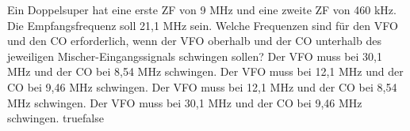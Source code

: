     {Ein Doppelsuper hat eine erste ZF von 9 MHz und eine zweite ZF von 460 kHz. Die Empfangsfrequenz soll 21,1 MHz sein. Welche Frequenzen sind für den VFO und den CO erforderlich, wenn der VFO oberhalb und der CO unterhalb des jeweiligen Mischer-Eingangssignals schwingen sollen?}
    {Der VFO muss bei 30,1 MHz und der CO bei 8,54 MHz schwingen.}
    {Der VFO muss bei 12,1 MHz und der CO bei 9,46 MHz schwingen.}
    {Der VFO muss bei 12,1 MHz und der CO bei 8,54 MHz schwingen.}
    {Der VFO muss bei 30,1 MHz und der CO bei 9,46 MHz schwingen.}
    {true}{false}
